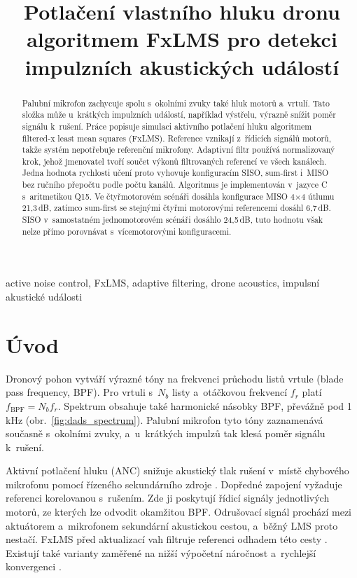 \documentclass[conference]{IEEEtran}
\begin{document}
\title{Potlačení vlastního hluku dronu algoritmem FxLMS pro detekci impulzních akustických událostí}

\author{
}

\maketitle

\begin{abstract}
Palubní mikrofon zachycuje spolu s~okolními zvuky také hluk motorů a~vrtulí. Tato složka může u~krátkých impulzních událostí, například výstřelu, výrazně snížit poměr signálu k~rušení. Práce popisuje simulaci aktivního potlačení hluku algoritmem filtered-x least mean squares (FxLMS). Reference vznikají z~řídicích signálů motorů, takže systém nepotřebuje referenční mikrofony. Adaptivní filtr používá normalizovaný krok, jehož jmenovatel tvoří součet výkonů filtrovaných referencí ve všech kanálech. Jedna hodnota rychlosti učení proto vyhovuje konfiguracím SISO, sum-first i~MISO bez ručního přepočtu podle počtu kanálů. Algoritmus je implementován v~jazyce C s~aritmetikou Q15. Ve čtyřmotorovém scénáři dosáhla konfigurace MISO 4$\times$4 útlumu 21{,}3\,dB, zatímco sum-first se stejnými čtyřmi motorovými referencemi dosáhl 6{,}7\,dB. SISO v~samostatném jednomotorovém scénáři dosáhlo 24{,}5\,dB, tuto hodnotu však nelze přímo porovnávat s~vícemotorovými konfiguracemi.
\end{abstract}

\begin{IEEEkeywords}
active noise control, FxLMS, adaptive filtering, drone acoustics, impulsní akustické události
\end{IEEEkeywords}

\section{Úvod}
Dronový pohon vytváří výrazné tóny na frekvenci průchodu listů vrtule (blade pass frequency, BPF). Pro vrtuli s~$N_b$ listy a~otáčkovou frekvencí $f_r$ platí $f_{\mathrm{BPF}}=N_b f_r$. Spektrum obsahuje také harmonické násobky BPF, převážně pod 1\,kHz (obr.~\ref{fig:dads_spectrum}). Palubní mikrofon tyto tóny zaznamenává současně s~okolními zvuky, a~u~krátkých impulzů tak klesá poměr signálu k~rušení.

Aktivní potlačení hluku (ANC) snižuje akustický tlak rušení v~místě chybového mikrofonu pomocí řízeného sekundárního zdroje \cite{elliott1993active,kuo1996anc}. Dopředné zapojení vyžaduje referenci korelovanou s~rušením. Zde ji poskytují řídicí signály jednotlivých motorů, ze kterých lze odvodit okamžitou BPF. Odrušovací signál prochází mezi aktuátorem a~mikrofonem sekundární akustickou cestou, a~běžný LMS proto nestačí. FxLMS před aktualizací vah filtruje referenci odhadem této cesty \cite{burgess1981duct,widrow1985adaptive}. Existují také varianty zaměřené na nižší výpočetní náročnost a~rychlejší konvergenci \cite{ramos2021modified}.
\end{document}
